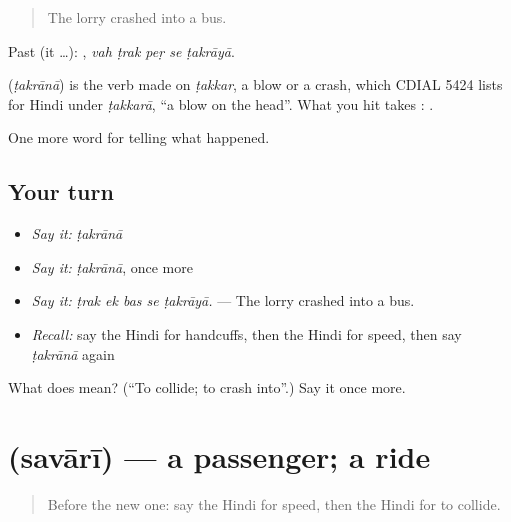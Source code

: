 \begin{quote}
The lorry crashed into a bus.
\end{quote}

Past (it …):     , \emph{vah ṭrak peṛ se ṭakrāyā}.

\begin{cousinweb}
\textbf{} (\emph{ṭakrānā}) is the verb made on \emph{ṭakkar}, a blow or a crash, which CDIAL 5424 lists for Hindi under \emph{ṭakkarā}, \textquotedblleft{}a blow on the head\textquotedblright{}. What you hit takes \textbf{}: \textbf{  }.
\end{cousinweb}

\begin{grammarlens}[title={What you've built}]
One more word for telling what happened.
\end{grammarlens}

\subsection*{Your turn}
\begin{itemize}
\raggedright
  \item \emph{Say it:} \emph{ṭakrānā}
  \item \emph{Say it:} \emph{ṭakrānā}, once more
  \item \emph{Say it:} \emph{ṭrak ek bas se ṭakrāyā.} — The lorry crashed into a bus.
  \item \emph{Recall:} say the Hindi for handcuffs, then the Hindi for speed, then say \emph{ṭakrānā} again
\end{itemize}

\begin{tcolorbox}[breakable,colback=teal!4,colframe=teal!35!black,title={Before you move on}]
What does  mean? (\textquotedblleft{}To collide; to crash into\textquotedblright{}.) Say it once more.
\end{tcolorbox}
\section[\texorpdfstring{\hi{सवारी} (savārī)}{सवारी (savārī)}]{ (savārī) — a passenger; a ride}

\label{lesson:HI-C296-savari}



\begin{quote}
Before the new one: say the Hindi for speed, then the Hindi for to collide.
\end{quote}

